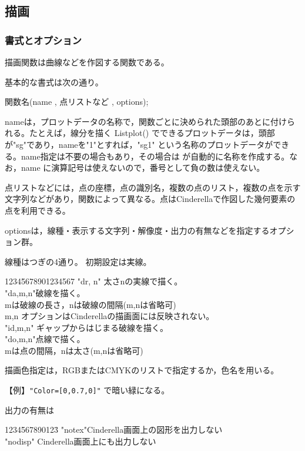 \documentclass[papersize,a4paper,10pt,uplatex]{jsarticle}
\begin{document}
\subsection{描画}
\subsubsection{書式とオプション}

描画関数は曲線などを作図する関数である。

基本的な書式は次の通り。

\hspace{20mm} 関数名(name , 点リストなど , options);

nameは，プロットデータの名称で，関数ごとに決められた頭部のあとに付けられる。たとえば，線分を描く Listplot() でできるプロットデータは，頭部が"sg"であり，nameを"1"とすれば，"sg1" という名称のプロットデータができる。name指定は不要の場合もあり，その場合は \ketcindy が自動的に名称を作成する。なお，name に演算記号は使えないので，番号として負の数は使えない。

点リストなどには，点の座標，点の識別名，複数の点のリスト，複数の点を示す文字列などがあり，関数によって異なる。点はCinderellaで作図した幾何要素の点を利用できる。

optionsは，線種・表示する文字列・解像度・出力の有無などを指定するオプション群。

 線種はつぎの4通り。 初期設定は実線。

\begin{tabbing}
1234\=5678901234567\=\kill
\>"dr, n" \>太さnの実線で描く。\\
\>"da,m,n"\>破線を描く。\\
\>\> mは破線の長さ，nは破線の間隔(m,nは省略可)\\
\> \>m,n オプションはCinderellaの描画面には反映されない。\\
\>"id,m,n" \>ギャップからはじまる破線を描く。\\
\>"do,m,n"\>点線で描く。\\
\>\>mは点の間隔，nは太さ(m,nは省略可)
\end{tabbing}

描画色指定は，RGBまたはCMYKのリストで指定するか，色名を用いる。

\hspace{10mm}【例】\verb|"Color=[0,0.7,0]"| で暗い緑になる。

出力の有無は
\begin{tabbing}
1234\=567890123\=\kill
 \>"notex"\>Cinderella画面上の図形を出力しない\\
 \>"nodisp" \>Cinderella画面上にも出力しない
 \end{tabbing}
 
\end{document}
